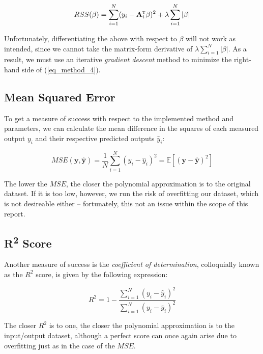 \documentclass[a4paper,10pt,english]{article}
\begin{document}
\begin{equation}
\label{eq_method_4}
RSS(\beta) = \sum_{i=1}^N (y_i - \mathbf{A}_i^\textsc{t} \beta)^2 + \lambda \sum_{i=1}^N |\beta|
\end{equation}

Unfortunately, differentiating the above with respect to $\beta$ will not work as intended, since we cannot take the matrix-form derivative of $\lambda \sum_{i=1}^N |\beta|$.  As a result, we must use an iterative \textit{gradient descent} method to minimize the right-hand side of (\ref{eq_method_4}).

\subsection*{Mean Squared Error}

To get a measure of success with respect to the implemented method and parameters, we can calculate the mean difference in the squares of each measured output $y_i$ and their respective predicted outputs $\hat{y}_i$:

\begin{equation}
MSE(\mathbf{y}, \mathbf{\hat{y}}) = \frac{1}{N} \sum_{i=1}^{N} (y_i - \hat{y}_i)^2 = \mathbb{E}\left[(\mathbf{y}-\hat{\mathbf{y}})^{2}\right]
\end{equation}

The lower the $MSE$, the closer the polynomial approximation is to the original dataset.  If it is too low, however, we run the risk of overfitting our dataset, which is not desireable either – fortunately, this not an issue within the scope of this report.

\subsection*{R\textsuperscript{2} Score}

Another measure of success is the \textit{coefficient of determination}, colloquially known as the $R^2$ score, is given by the following expression:

\begin{equation}
R^2 = 1 - \frac{\sum_{i=1}^N (y_i - \hat{y}_i)^2 }{\sum_{i=1}^N (y_i - \bar{y}_i)^2 }
\end{equation}

The closer $R^2$ is to one, the closer the polynomial approximation is to the input/output dataset, although a perfect score can once again arise due to overfitting just as in the case of the $MSE$.
\end{document}
